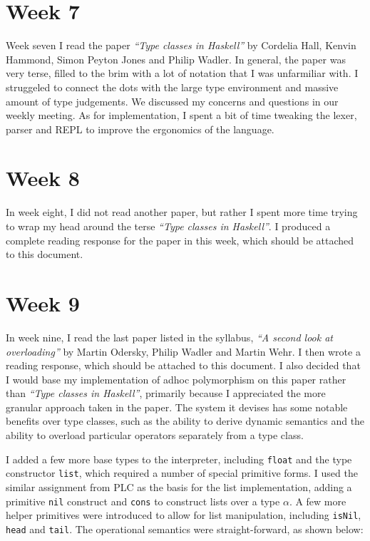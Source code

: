\documentclass[11pt,a4paper]{article}
\begin{document}
\section*{Week 7}

Week seven I read the paper \textit{``Type classes in Haskell''} by Cordelia Hall,
Kenvin Hammond, Simon Peyton Jones and Philip Wadler. In general, the paper was
very terse, filled to the brim with a lot of notation that I was unfarmiliar with.
I struggeled to connect the dots with the large type environment and massive amount
of type judgements. We discussed my concerns and questions in our weekly meeting.
As for implementation, I spent a bit of time tweaking the lexer, parser and REPL
to improve the ergonomics of the language.


\section*{Week 8}

In week eight, I did not read another paper, but rather I spent more time trying
to wrap my head around the terse \textit{``Type classes in Haskell''}. I produced
a complete reading response for the paper in this week, which should be attached
to this document.

\section*{Week 9}

In week nine, I read the last paper listed in the syllabus, \textit{``A second
look at overloading''} by Martin Odersky, Philip Wadler and Martin Wehr. I then
wrote a reading response, which should be attached to this document. I also
decided that I would base my implementation of adhoc polymorphism on this paper
rather than \textit{``Type classes in Haskell''}, primarily because I appreciated
the more granular approach taken in the paper. The system it devises has some
notable benefits over type classes, such as the ability to derive dynamic semantics
and the ability to overload particular operators separately from a type class.

I added a few more base types to the interpreter, including \verb|float| and
the type constructor \verb|list|, which required a number of special primitive
forms. I used the similar assignment from PLC as the basis for the list
implementation, adding a primitive \verb|nil| construct and \verb|cons| to
construct lists over a type $\alpha$. A few more helper primitives were introduced
to allow for list manipulation, including \verb|isNil|, \verb|head| and \verb|tail|.
The operational semantics were straight-forward, as shown below:
\end{document}
